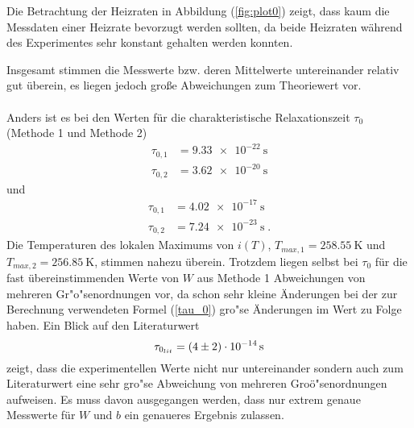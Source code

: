   Die Betrachtung der Heizraten in Abbildung (\ref{fig:plot0}) zeigt, dass kaum die Messdaten einer Heizrate bevorzugt werden sollten, da beide Heizraten während des Experimentes sehr konstant gehalten werden konnten.

Insgesamt stimmen die Messwerte bzw. deren Mittelwerte untereinander relativ gut überein, es liegen jedoch große Abweichungen zum Theoriewert vor.\\
  \\ Anders ist es bei den Werten für die charakteristische Relaxationszeit $\tau_0$ (Methode 1 und Methode 2)
  \begin{align}
    \tau_{0,1}&=\SI{9,33e-22}{\second}\\
    \tau_{0,2}&=\SI{3,62e-20}{\second}
  \end{align}
 und
 \begin{align}
   \tau_{0,1}&=\SI{4,02e-17}{\second}\\
   \tau_{0,2}&=\SI{7,24e-23}{\second} \; .
 \end{align}
 Die Temperaturen des lokalen Maximums von $i(T)$, $T_{max,1}=\SI{258,55}{\kelvin}$ und $T_{max,2} = \SI{256,85}{\kelvin}$, stimmen nahezu überein.
  Trotzdem liegen selbst bei $\tau_0$ für die fast übereinstimmenden Werte von $W$ aus Methode 1 Abweichungen von mehreren Gr"o"senordnungen vor, da schon sehr kleine Änderungen bei der zur Berechnung verwendeten Formel (\ref{tau_0}) gro"se Änderungen im Wert zu Folge haben.
  Ein Blick auf den Literaturwert
  \begin{equation}
    \tau_{0_{lit}}=\SI{4 \pm 2e-14}{\second}
  \end{equation} zeigt, dass die experimentellen Werte nicht nur untereinander sondern auch zum Literaturwert eine sehr gro"se Abweichung von mehreren Groö"senordnungen aufweisen.
  Es muss davon ausgegangen werden, dass nur extrem genaue Messwerte für $W$ und $b$ ein genaueres Ergebnis zulassen.
